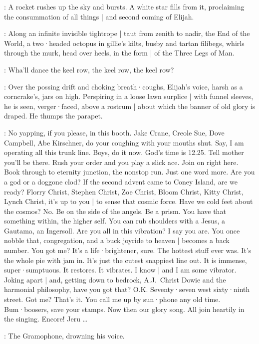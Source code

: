 :
A rocket rushes up the sky and bursts.
A white star fills from it,
proclaiming the consummation of all things |
and second coming of Elijah.

:
Along an infinite invisible tightrope |
taut from zenith to nadir,
the End of the World,
a two·headed octopus in gillie's kilts,
busby and tartan filibegs,
whirls through the murk,
head over heels,
in the form |
of the Three Legs of Man.

\EndOfWorld:
Wha'll dance the keel row,
the keel row,
the keel row?

:
Over the possing drift and choking breath·coughs,
Elijah's voice,
harsh as a corncrake's,
jars on high.
Perspiring in a loose lawn surplice |
with funnel sleeves,
he is seen,
verger·faced,
above a rostrum |
about which the banner of old glory is draped.
He thumps the parapet.

\Elijah:
No yapping,
if you please,
in this booth.
Jake Crane,
Creole Sue,
Dove Campbell,
Abe Kirschner,
do your coughing with your mouths shut.
Say,
I am operating all this trunk line.
Boys,
do it now.
God's time is 12.25.
Tell mother you'll be there.
Rush your order and you play a slick ace.
Join on right here.
Book through to eternity junction,
the nonstop run.
Just one word more.
Are you a god or a doggone clod?
If the second advent came to Coney Island,
are we ready?
Florry Christ,
Stephen Christ,
Zoe Christ,
Bloom Christ,
Kitty Christ,
Lynch Christ,
it's up to you |
to sense that cosmic force.
Have we cold feet about the cosmos?
No.
Be on the side of the angels.
Be a prism.
You have that something within,
the higher self.
You can rub shoulders with a Jesus,
a Gautama,
an Ingersoll.
Are you all in this vibration?
I say you are.
You once nobble that,
congregation,
and a buck joyride to heaven |
becomes a back number.
You got me?
It's a life·brightener,
sure.
The hottest stuff ever was.
It's the whole pie with jam in.
It's just the cutest snappiest line out.
It is immense,
super·sumptuous.
It restores.
It vibrates.
I know |
and I am some vibrator.
Joking apart |
and,
getting down to bedrock,
A.J.~Christ Dowie and the harmonial philosophy,
have you got that?
O.K.
Seventy·seven west sixty·ninth street.
Got me?
That's it.
You call me up by sun·phone any old time.
Bum·boosers,
save your stamps.
Now then our glory song.
All join heartily in the singing.
Encore!
Jeru \ldots

:
The Gramophone,
drowning his voice.

